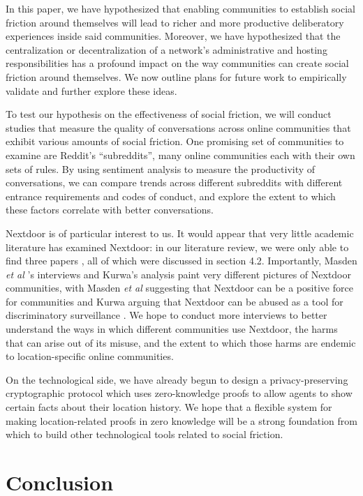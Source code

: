 \documentclass[sigconf,authordraft]{acmart}
\newcommand{\etal}{{\itshape et al }}
\begin{document}
In this paper, we have hypothesized that enabling communities to establish social friction around themselves will lead to richer and more productive deliberatory experiences inside said communities. Moreover, we have hypothesized that the centralization or decentralization of a network's administrative and hosting responsibilities has a profound impact on the way communities can create social friction around themselves. We now outline plans for future work to empirically validate and further explore these ideas.

To test our hypothesis on the effectiveness of social friction, we will conduct studies that measure the quality of conversations across online communities that exhibit various amounts of social friction. One promising set of communities to examine are Reddit's ``subreddits'', many online communities each with their own sets of rules. By using sentiment analysis to measure the productivity of conversations, we can compare trends across different subreddits with different entrance requirements and codes of conduct, and explore the extent to which these factors correlate with better conversations.

Nextdoor is of particular interest to us. It would appear that very little academic literature has examined Nextdoor: in our literature review, we were only able to find three papers \cite{masden2014tensions, kurwa2019building, payne2017welcome}, all of which were discussed in section 4.2. Importantly, Masden \etal's interviews and Kurwa's analysis paint very different pictures of Nextdoor communities, with Masden \etal suggesting that Nextdoor can be a positive force for communities \cite{masden2014tensions} and Kurwa arguing that Nextdoor can be abused as a tool for discriminatory surveillance \cite{kurwa2019building}. We hope to conduct more interviews to better understand the ways in which different communities use Nextdoor, the harms that can arise out of its misuse, and the extent to which those harms are endemic to location-specific online communities.

On the technological side, we have already begun to design a privacy-preserving cryptographic protocol which uses zero-knowledge proofs \cite{goldreich1991proofs} to allow agents to show certain facts about their location history. We hope that a flexible system for making location-related proofs in zero knowledge will be a strong foundation from which to build other technological tools related to social friction.


\section{Conclusion}
\end{document}
